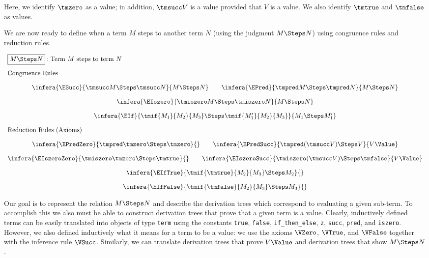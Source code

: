 Here, we identify $\tmzero$ as a value; in addition, $\tmsucc V$ is a value
provided that $V$ is a value. We also identify $\tmtrue$ and $\tmfalse$ as
values. %

We are now ready to define when a term $M$ steps to another term $N$ (using the
judgment $M \Steps N$) using congruence rules and reduction rules.

\[
\begin{array}{c}
\multicolumn{1}{l}{\fbox{$M \Steps N$}: \mbox{Term $M$ steps to term $N$}}
\\[1em]
\multicolumn{1}{l}{\mbox{\text{Congruence Rules}}}
\\[1em]
\infera{\ESucc}{\tmsucc M \Steps \tmsucc N}{M \Steps N}\qquad
\infera{\EPred}{\tmpred M \Steps \tmpred N}{M \Steps N}
\\[1em]
\multicolumn{1}{c}{\infera{\EIszero}{\tmiszero M \Steps \tmiszero N}{M \Steps N}}
\\[1em]
\multicolumn{1}{c}{\infera{\EIf}{\tmif{M_1}{M_2}{M_3} \Steps \tmif{M_1'}{M_2}{M_3}}{M_1 \Steps M_1'}}
\\[1em]
\multicolumn{1}{l}{\mbox{\text{Reduction Rules (Axioms)}}}
\\[1em]
\infera{\EPredZero}{\tmpred \tmzero \Steps \tmzero}{}\qquad
\infera{\EPredSucc}{\tmpred (\tmsucc V) \Steps V}{V \Value}
\\[1em]
\infera{\EIszeroZero}{\tmiszero \tmzero \Steps \tmtrue}{} \qquad
\infera{\EIszeroSucc}{\tmiszero (\tmsucc V) \Steps \tmfalse}{V \Value}
\\[1em]
\multicolumn{1}{c}{\infera{\EIfTrue }{\tmif{\tmtrue }{M_2}{M_3} \Steps M_2}{}}
\\[1em]
\multicolumn{1}{c}{\infera{\EIfFalse}{\tmif{\tmfalse}{M_2}{M_3} \Steps M_3}{}}
\end{array}
\]

Our goal is to represent the relation $M \Steps N$ and describe the derivation
trees which correspond to evaluating a given sub-term. To accomplish this we
also must be able to construct derivation trees that prove that a given term is
a value.  Clearly, inductively defined terms can be easily translated into objects of
type \lstinline!term! using the constants \lstinline!true!,
\lstinline!false!, \lstinline!if_then_else!, \lstinline!z!,
\lstinline!succ!, \lstinline!pred!, and \lstinline!iszero!.
However, we also defined inductively what it means for a
term to be a value:  we use the  axioms $\VZero$, $\VTrue$, and
$\VFalse$ together with the inference rule $\VSucc$. Similarly, we can
translate derivation trees that prove $V \Value$ and derivation trees
that show $M \Steps N$.

